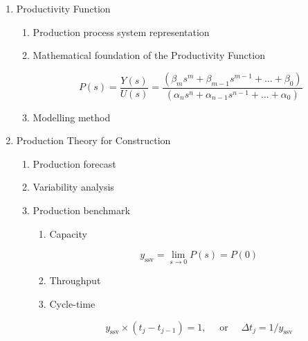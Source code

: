 \documentclass{article}
\begin{document}
\begin{enumerate}
\item Productivity Function
\label{sec:org5e8ee47}
\begin{enumerate}
\item Production process system representation
\label{sec:org2c841fb}
\item Mathematical foundation of the Productivity Function
\label{sec:orgdebc9be}

\begin{equation}\label{eq:Productivity_Function}
	P(s) = \frac{Y(s)}{U(s)} =
	\frac{(\beta_m s^m + \beta_{m-1} s^{m-1}+\ldots+\beta_0)}{(\alpha_n s^n + \alpha_{n-1} s^{n-1}+\ldots+\alpha_0)}
\end{equation}

\item Modelling method
\label{sec:org2717f4f}
\end{enumerate}
\item Production Theory for Construction
\label{sec:orgfe72617}
\begin{enumerate}
\item Production forecast
\label{sec:orga6f93ee}
\item Variability analysis
\label{sec:orga1ebfd4}
\item Production benchmark
\label{sec:org62f7664}
\begin{enumerate}
\item Capacity
\label{sec:org1ffc837}

\begin{equation}\label{eq:Capacity}
	y_{\mbox{ssv}} = \lim_{s \rightarrow 0} P(s) = P(0)
\end{equation}
\item Throughput
\label{sec:org524ea16}
\item Cycle-time
\label{sec:org903bb02}

\begin{equation}\label{eq:CycleTime}
	y_{\mbox{ssv}} \times (t_j-t_{j-1}) = 1, \quad\mbox{ or }\quad \Delta t_j = 1/y_{\mbox{ssv}}
\end{equation}


\end{enumerate}
\end{enumerate}
\end{enumerate}
\end{document}
